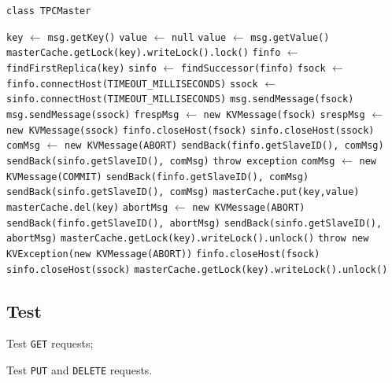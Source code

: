 \documentclass{article}
\begin{document}
\begin{algorithm}
	\caption{\texttt{class TPCMaster}}
	\begin{algorithmic}
			\State \texttt{key} $\leftarrow$ \texttt{msg.getKey()}
			\State \texttt{value} $\leftarrow$ \texttt{null}
				\State \texttt{value} $\leftarrow$ \texttt{msg.getValue()}
    	\EndIf
			\State \texttt{masterCache.getLock(key).writeLock().lock()}
			\State \texttt{finfo} $\leftarrow$ \texttt{findFirstReplica(key)}
			\State \texttt{sinfo} $\leftarrow$ \texttt{findSuccessor(finfo)}
			\State \texttt{fsock} $\leftarrow$ \texttt{finfo.connectHost(TIMEOUT\_MILLISECONDS)}
			\State \texttt{ssock} $\leftarrow$ \texttt{sinfo.connectHost(TIMEOUT\_MILLISECONDS)}
    	\State \texttt{msg.sendMessage(fsock)}
			\State \texttt{msg.sendMessage(ssock)}
			\State \texttt{frespMsg} $\leftarrow$ \texttt{new KVMessage(fsock)}
			\State \texttt{srespMsg} $\leftarrow$ \texttt{new KVMessage(ssock)}
				\State \texttt{finfo.closeHost(fsock)}
				\State \texttt{sinfo.closeHost(ssock)}
				\State \texttt{comMsg} $\leftarrow$ \texttt{new KVMessage(ABORT)}
				\State \texttt{sendBack(finfo.getSlaveID(), comMsg)}
				\State \texttt{sendBack(sinfo.getSlaveID(), comMsg)}
				\State \texttt{throw exception}
			\EndIf
				\State \texttt{comMsg} $\leftarrow$ \texttt{new KVMessage(COMMIT)}
				\State \texttt{sendBack(finfo.getSlaveID(), comMsg)}
				\State \texttt{sendBack(sinfo.getSlaveID(), comMsg)}
					\State \texttt{masterCache.put(key,value)}
				\Else
					\State \texttt{masterCache.del(key)}
				\EndIf
			\Else
	    	\State \texttt{abortMsg} $\leftarrow$ \texttt{new KVMessage(ABORT)}
	    	\State \texttt{sendBack(finfo.getSlaveID(), abortMsg)}
    		\State \texttt{sendBack(sinfo.getSlaveID(), abortMsg)}
				\State \texttt{masterCache.getLock(key).writeLock().unlock()}
				\State \texttt{throw new KVException(new KVMessage(ABORT))}
    	\EndIf
			\State \texttt{finfo.closeHost(fsock)}
			\State \texttt{sinfo.closeHost(ssock)}
			\State \texttt{masterCache.getLock(key).writeLock().unlock()}
		\EndProcedure
	\end{algorithmic}
\end{algorithm}
\subsection{Test}
\begin{compactitem}
	\item Test \texttt{GET} requests;
	\item Test \texttt{PUT} and \texttt{DELETE} requests.
\end{compactitem}
\end{document}
